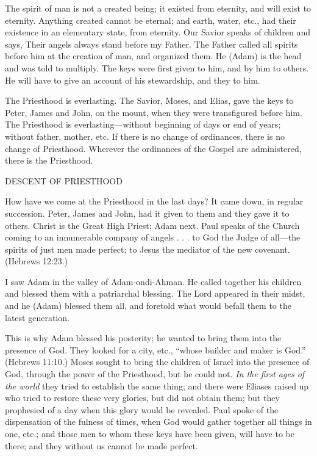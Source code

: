 The spirit of man is not a created being; it existed from eternity, and will exist to eternity.
Anything created cannot be eternal; and earth, water, etc., had their existence in an
elementary state, from eternity. Our Savior speaks of children and says, Their angels always
stand before my Father. The Father called all spirits before him at the creation of man, and
organized them. He (Adam) is the head and was told to multiply. The keys were first given to
him, and by him to others. He will have to give an account of his stewardship, and they to
him.

The Priesthood is everlasting. The Savior, Moses, and Elias, gave the keys to Peter, James
and John, on the mount, when they were transfigured before him. The Priesthood is
everlasting—without beginning of days or end of years; without father, mother, etc. If there
is no change of ordinances, there is no change of Priesthood. Wherever the ordinances of the
Gospel are administered, there is the Priesthood.

DESCENT OF PRIESTHOOD

How have we come at the Priesthood in the last days? It came down, in regular succession.
Peter, James and John, had it given to them and they gave it to others. Christ is the Great
High Priest; Adam next. Paul speaks of the Church coming to an innumerable company of
angels . . . to God the Judge of all—the spirits of just men made perfect; to Jesus the mediator
of the new covenant. (Hebrews 12:23.)

I saw Adam in the valley of Adam-ondi-Ahman. He called together his children and blessed
them with a patriarchal blessing. The Lord appeared in their midst, and he (Adam) blessed
them all, and foretold what would befall them to the latest generation.

This is why Adam blessed his posterity; he wanted to bring them into the presence of God.
They looked for a city, etc., ``whose builder and maker is God.'' (Hebrews 11:10.) Moses
sought to bring the children of Israel into the presence of God, through the power of the
Priesthood, but he could not. \textit{In the first ages of the world} they tried to establish the same
thing; and there were Eliases raised up who tried to restore these very glories, but did not
obtain them; but they prophesied of a day when this glory would be revealed. Paul spoke of
the dispensation of the fulness of times, when God would gather together all things in one,
etc.; and those men to whom these keys have been given, will have to be there; and they
without us cannot be made perfect.

